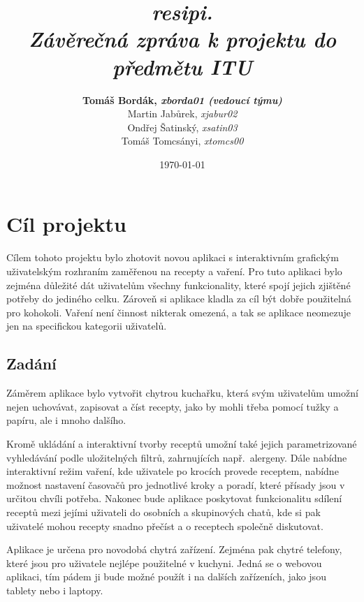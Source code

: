 \documentclass[a4paper, 11pt]{article}
\title {
    {\Huge \emph{\textbf{resipi.}}{\huge}} \\[0.25em] %
    {\Large \emph{Závěrečná zpráva k projektu do předmětu ITU}}
}
\author {
    \textbf{{\Large Tomáš Bordák,}
    \emph{\large xborda01 (vedoucí týmu)}} \\[0.5em]
    {\Large Martin Jabůrek,} 
    \emph{\large xjabur02} \\[0.3em]
    {\Large Ondřej Šatinský,} 
    \emph{\large xsatin03} \\[0.5em]
    {\Large Tomáš Tomcsányi,} 
    \emph{\large xtomcs00}
}
\date{\today}
\begin{document}
    
    
    \clearpage
    \vspace*{\fill}
    \begin{center}
    \begin{minipage}{1\textwidth}
    \maketitle
    \end{minipage}
    \end{center}
    \vfill %
    \clearpage

    \tableofcontents
    \newpage

\section{Cíl projektu}

Cílem tohoto projektu bylo zhotovit novou aplikaci s interaktivním
grafickým uživatelským rozhraním zaměřenou na recepty a vaření. Pro tuto aplikaci bylo
zejména důležité dát uživatelům všechny funkcionality, které spojí jejich zjištěné potřeby
do jediného celku. Zároveň si aplikace kladla za cíl být dobře použitelná pro kohokoli.
Vaření není činnost nikterak omezená, a tak se aplikace neomezuje jen
na specifickou kategorii uživatelů.


\subsection{Zadání}

Záměrem aplikace bylo vytvořit chytrou kuchařku, která svým uživatelům umožní
nejen uchovávat, zapisovat a číst recepty, jako by mohli třeba pomocí tužky a papíru,
ale i mnoho dalšího.

Kromě ukládání a interaktivní tvorby receptů umožní také jejich
parametrizované vyhledávání podle u\-lo\-ži\-tel\-ných filtrů, zahrnujících např.\ alergeny.
Dále nabídne interaktivní režim vaření, kde uživatele po krocích provede
receptem, nabídne možnost nastavení časovačů pro jednotlivé kroky a poradí, které přísady
jsou v určitou chvíli potřeba. Nakonec bude aplikace poskytovat funkcionalitu
sdílení receptů mezi jejími uživateli do osobních a skupinových chatů, kde
si pak uživatelé mohou recepty snadno přečíst a o receptech společně diskutovat.

Aplikace je určena pro novodobá chytrá zařízení. Zejména pak chytré telefony,
které jsou pro uživatele nejlépe použitelné v kuchyni. Jedná se o webovou aplikaci,
tím pádem ji bude možné použít i na dalších zařízeních, jako jsou tablety nebo i laptopy.
\end{document}
